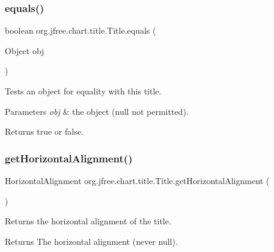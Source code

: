 \subsubsection{\texorpdfstring{equals()}{equals()}}
{\footnotesize\ttfamily boolean org.\+jfree.\+chart.\+title.\+Title.\+equals (\begin{DoxyParamCaption}\item[{Object}]{obj }\end{DoxyParamCaption})}

Tests an object for equality with this title.


\begin{DoxyParams}{Parameters}
{\em obj} & the object ({\ttfamily null} not permitted).\\
\hline
\end{DoxyParams}
\begin{DoxyReturn}{Returns}
{\ttfamily true} or {\ttfamily false}. 
\end{DoxyReturn}
\mbox{\label{classorg_1_1jfree_1_1chart_1_1title_1_1_title_ac3f5c158c4257e5981ce7e2513d28386}} 
\subsubsection{\texorpdfstring{get\+Horizontal\+Alignment()}{getHorizontalAlignment()}}
{\footnotesize\ttfamily Horizontal\+Alignment org.\+jfree.\+chart.\+title.\+Title.\+get\+Horizontal\+Alignment (\begin{DoxyParamCaption}{ }\end{DoxyParamCaption})}

Returns the horizontal alignment of the title.

\begin{DoxyReturn}{Returns}
The horizontal alignment (never {\ttfamily null}). 
\end{DoxyReturn}
\mbox{\label{classorg_1_1jfree_1_1chart_1_1title_1_1_title_abc0efc874ed0437fba9cfd94c3a56423}} 
